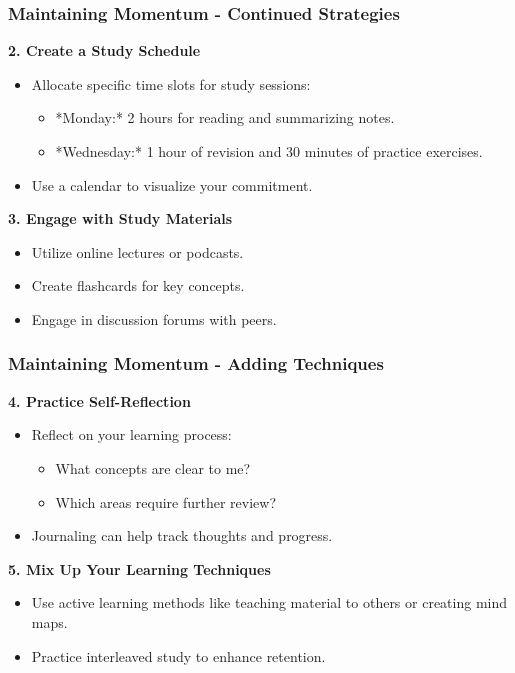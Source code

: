\documentclass[aspectratio=169]{beamer}
\begin{document}
\begin{frame}[fragile]
    \frametitle{Maintaining Momentum - Continued Strategies}
    \textbf{2. Create a Study Schedule}
    \begin{itemize}
        \item Allocate specific time slots for study sessions:
        \begin{itemize}
            \item *Monday:* 2 hours for reading and summarizing notes.
            \item *Wednesday:* 1 hour of revision and 30 minutes of practice exercises.
        \end{itemize}
        \item Use a calendar to visualize your commitment.
    \end{itemize}

    \textbf{3. Engage with Study Materials}
    \begin{itemize}
        \item Utilize online lectures or podcasts.
        \item Create flashcards for key concepts.
        \item Engage in discussion forums with peers.
    \end{itemize}
\end{frame}

\begin{frame}[fragile]
    \frametitle{Maintaining Momentum - Adding Techniques}
    \textbf{4. Practice Self-Reflection}
    \begin{itemize}
        \item Reflect on your learning process:
        \begin{itemize}
            \item What concepts are clear to me?
            \item Which areas require further review?
        \end{itemize}
        \item Journaling can help track thoughts and progress.
    \end{itemize}
    
    \textbf{5. Mix Up Your Learning Techniques}
    \begin{itemize}
        \item Use active learning methods like teaching material to others or creating mind maps.
        \item Practice interleaved study to enhance retention.
    \end{itemize}
\end{frame}
\end{document}
